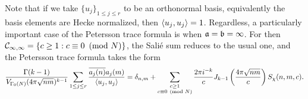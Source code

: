     Note that if we take $\{u_{j}\}_{1 \le j \le r}$ to be an orthonormal basis, equivalently the basis elements are Hecke normalized, then $\langle u_{j},u_{j}\rangle = 1$. Regardless, a particularly important case of the Petersson trace formula is when $\mathfrak{a} = \mathfrak{b} = \infty$. For then $\mathcal{C}_{\infty,\infty} = \{c \ge 1:c \equiv 0 \ \left(\text{mod }N\right)\}$, the Sali\'e sum reduces to the usual one, and the Petersson trace formula takes the form
    \[
      \frac{\Gamma(k-1)}{V_{\Gamma_{0}(N)}(4\pi \sqrt{nm})^{k-1}}\sum_{1 \le j \le r}\frac{\overline{a_{j}(n)}a_{j}(m)}{\langle u_{j},u_{j}\rangle} = \delta_{n,m}+\sum_{\substack{c \ge 1 \\ c \equiv 0 \ \left(\text{mod }N\right)}}\frac{2\pi i^{-k}}{c}J_{k-1}\left(\frac{4\pi\sqrt{nm}}{c}\right)S_{\chi}(n,m,c).
    \]
  \section{}